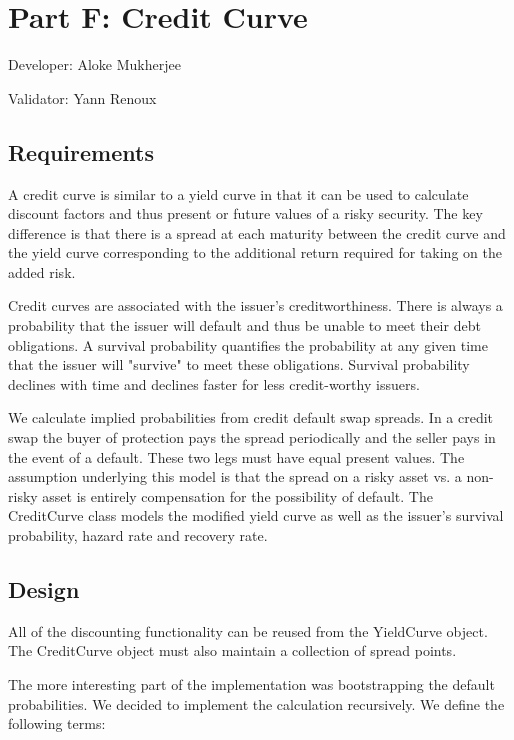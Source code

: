 \chapter{Part F: Credit Curve}
Developer: Aloke Mukherjee

\noindent Validator: Yann Renoux



\section{Requirements}

A credit curve is similar to a yield curve in that it can be used to
calculate discount factors and thus present or future values of a
risky security.  The key difference is that there is a spread at
each maturity between the credit curve and the yield curve
corresponding to the additional return required for taking on the
added risk.

Credit curves are associated with the issuer's creditworthiness.
There is always a probability that the issuer will default and thus
be unable to meet their debt obligations.  A survival probability
quantifies the probability at any given time that the issuer will
"survive" to meet these obligations.  Survival probability declines
with time and declines faster for less credit-worthy issuers.

We calculate implied probabilities from credit default swap spreads.
In a credit swap the buyer of protection pays the spread
periodically and the seller pays in the event of a default.  These
two legs must have equal present values.  The assumption underlying
this model is that the spread on a risky asset vs. a non-risky asset
is entirely compensation for the possibility of default.  The
CreditCurve class models the modified yield curve as well as the
issuer's survival probability, hazard rate and recovery rate.

\section{Design }

All of the discounting functionality can be reused from the
YieldCurve object.  The CreditCurve object must also maintain a
collection of spread points.

The more interesting part of the implementation was bootstrapping
the default probabilities.  We decided to implement the calculation
recursively.  We define the following terms:

